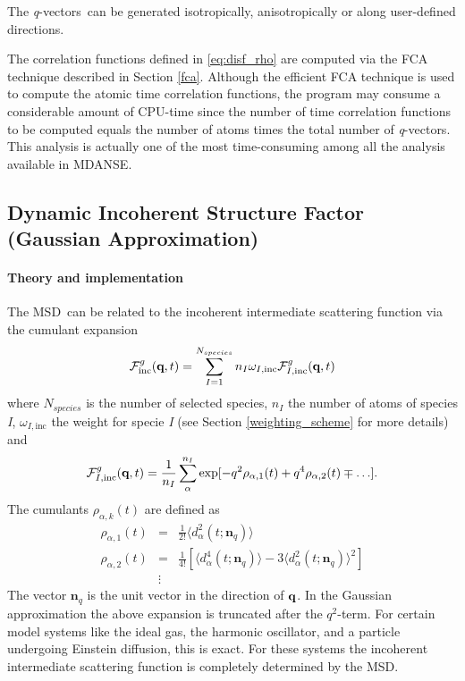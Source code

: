 \documentclass[a4paper,11pt]{article}
\newcommand{\qvects}{\textit{q}-vectors}
\begin{document}
The \qvects\ can be generated isotropically, anisotropically or along user-defined directions.

The correlation functions defined in \ref{eq:disf_rho} are computed via the \gls{FCA} technique described in Section \ref{fca}.
Although the efficient \gls{FCA} technique is used to compute the atomic time correlation functions, the program may consume a
considerable amount of CPU-time since the number of time correlation functions to be computed equals the number of
atoms times the total number of \qvects. This analysis is actually one of the most time-consuming among all the analysis available in
\gls{MDANSE}.

\subsection{Dynamic Incoherent Structure Factor (Gaussian Approximation)}
\label{disfg}
\paragraph{Theory and implementation\\}
\label{disfg_theory}
The \gls{MSD}\ can be related to the incoherent intermediate scattering function  via the cumulant expansion
\cite{Rahman:1962,Yip:1980}
\begin{equation}
\label{eq:fqt_cumulant}
{\cal F}^{g}_{\mathrm{inc}}(\textbf{q},t) = \sum\limits^{N_{species}}_{I = 1} n_I \omega_{I,\mathrm{inc}} {\cal F}^{g}_{I,\mathrm{inc}}(\textbf{q},t)
\end{equation}
where $N_{species}$ is the number of selected species, $n_I$ the number of atoms of species \textit{I},
$\omega_{I,\mathrm{inc}}$ the weight for specie \textit{I} (see Section \ref{weighting_scheme} for more details) and
\begin{equation}
\label{eq:fqt_cumulant_1}
{\cal F}^{g}_{I,\mathrm{inc}}(\textbf{q},t) = \frac{1}{n_I}\sum\limits^{n_I}_{\alpha} \exp[-q^2\rho_{\alpha,1}(t) + q^4\rho_{\alpha,2}(t) \mp\ldots].
\end{equation}
The cumulants $\rho_{\alpha,k}(t)$ are defined as
\begin{eqnarray}
\rho_{\alpha,1}(t) &= &\frac{1}{2!}
\langle d^2_\alpha(t;\textbf{n}_q) \rangle \\
\rho_{\alpha,2}(t) &= &\frac{1}{4!}\left[
\langle d_\alpha^4(t;\textbf{n}_q)\rangle - 3\langle d^2_\alpha(t;\textbf{n}_q)
\rangle^2\right] \\
&\vdots &\nonumber
\end{eqnarray}
The vector $\textbf{n}_q$ is the unit vector in the direction of ${\bf q}$. In the Gaussian approximation the above
expansion is truncated after the $q^2$-term. For certain model systems like the ideal gas, the harmonic oscillator,
and a particle undergoing Einstein diffusion, this is exact. For these systems the incoherent intermediate scattering
function is completely determined by the \gls{MSD}.
\end{document}
